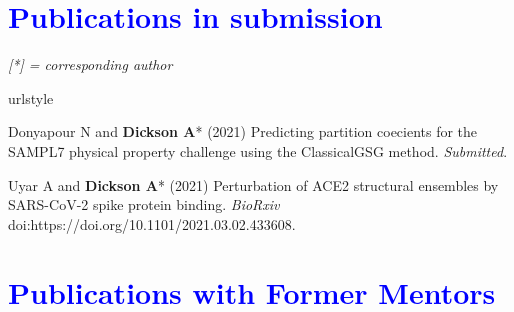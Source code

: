\documentclass[margin,line]{res}
\begin{document}
\begin{resume}
\begin{spacing}{1.2}
\begin{thebibliography}{10}
\end{thebibliography}
\end{spacing}
\endgroup

\section{\sc \textcolor{blue}{Publications in submission}}


\emph{[*] = corresponding author}
\vspace {0.05in}

\begingroup
\begin{spacing}{1.2}
\renewcommand{\section}[2]{}%
\begin{thebibliography}{10}
\providecommand{\url}[1]{\texttt{#1}}
\providecommand{\urlprefix}{URL }
\expandafter\ifx\csname urlstyle\endcsname\relax
  \providecommand{\doi}[1]{doi:\discretionary{}{}{}#1}\else
  \providecommand{\doi}{doi:\discretionary{}{}{}\begingroup
  \urlstyle{rm}\Url}\fi
\providecommand{\bibAnnoteFile}[1]{%
  \IfFileExists{#1}{\begin{quotation}\noindent\textsc{Key:} #1\\
  \textsc{Annotation:}\ \end{quotation}}{}}
\providecommand{\bibAnnote}[2]{%
  \begin{quotation}\noindent\textsc{Key:} #1\\
  \textsc{Annotation:}\ #2\end{quotation}}
\providecommand{\eprint}[2][]{\url{#2}}

\setlength{\itemsep}{0.15in}

Donyapour N and {\bf Dickson A}* (2021) Predicting partition coecients for the SAMPL7 physical property challenge using the ClassicalGSG method.
\newblock \textit{Submitted}.

Uyar A and {\bf Dickson A}* (2021) Perturbation of ACE2 structural ensembles by SARS-CoV-2 spike protein binding.
\newblock \textit{BioRxiv} doi:https://doi.org/10.1101/2021.03.02.433608.

\end{thebibliography}
\end{spacing}
\endgroup

\section{\sc \textcolor{blue}{Publications with Former Mentors}}


\end{resume}
\end{document}
